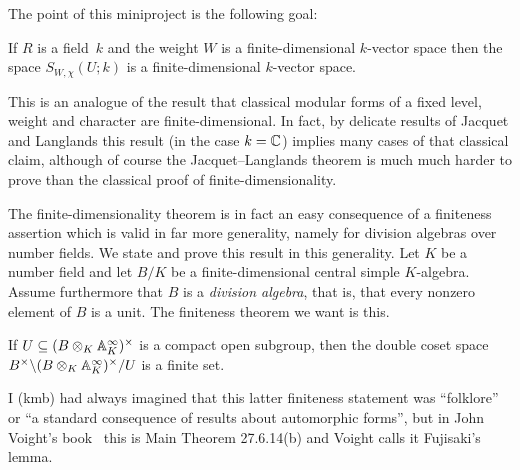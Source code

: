 The point of this miniproject is the following goal:

\begin{theorem}
  \label{TotallyDefiniteQuaternionAlgebra.AutomorphicForm.finiteDimensional}
  If $R$ is a field~$k$ and the weight $W$ is a finite-dimensional $k$-vector space
  then the space $S_{W,\chi}(U;k)$ is a finite-dimensional $k$-vector space.
\end{theorem}

This is an analogue of the result that classical modular forms of a fixed
level, weight and character are finite-dimensional. In fact, by delicate results
of Jacquet and Langlands this result (in the case $k=\mathbb{C}$) implies many cases of that classical claim,
although of course the Jacquet--Langlands theorem is much much harder to prove than the classical
proof of finite-dimensionality.

The finite-dimensionality theorem is in fact an easy consequence of a finiteness assertion
which is valid in far more generality, namely for division algebras over number fields.
We state and prove this result in this generality. Let $K$ be a number field and let $B/K$
be a finite-dimensional central simple $K$-algebra. Assume furthermore that $B$ is a
\emph{division algebra}, that is, that every nonzero element of $B$ is a unit. The finiteness
theorem we want is this.

\begin{theorem}
  \label{DivisionAlgebra.finiteDoubleCoset}
  If $U\subseteq (B\otimes_K\mathbb{A}_K^\infty)^\times$ is a compact open subgroup,
  then the double coset space $B^\times\backslash(B\otimes_K\mathbb{A}_K^\infty)^\times/U$ is a
  finite set.
\end{theorem}

I (kmb) had always imagined that this latter finiteness statement was ``folklore'' or
``a standard consequence of results about automorphic forms'', but in John Voight's
book~\cite{voightbook} this is Main Theorem 27.6.14(b) and Voight calls it Fujisaki’s lemma.

